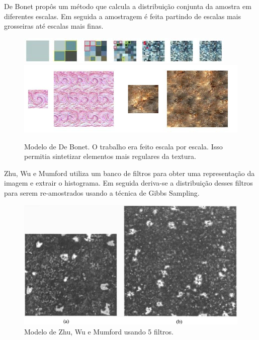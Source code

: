 
De Bonet \cite{Bonet1997} propôs
um método que calcula a distribuição
conjunta da amostra em diferentes
escalas. Em seguida a amostragem
é feita partindo de escalas mais
grosseiras até escalas mais finas.

\begin{figure}[!ht]
	\includegraphics[width=\linewidth]{files/assets/articles/bonet2.png}
	\includegraphics[width=\linewidth]{files/assets/articles/bonet.png}
	\caption{Modelo de De Bonet. O trabalho era feito escala
	por escala. Isso permitia sintetizar elementos mais regulares
    da textura.}
	\label{img:preview}
\end{figure}

Zhu, Wu e Mumford \cite{Zhu1998}
utiliza um banco de filtros para
obter uma representação da imagem
e extrair o histograma.
Em seguida deriva-se a distribuição
desses filtros para serem re-amostrados
usando a técnica de Gibbs Sampling.

\begin{figure}[!ht]
	\centering
	\includegraphics[width=\linewidth*2/3]{files/assets/articles/zhu.png}
	\caption{Modelo de Zhu, Wu e Mumford usando 5 filtros.}
	\label{img:preview}
\end{figure}


